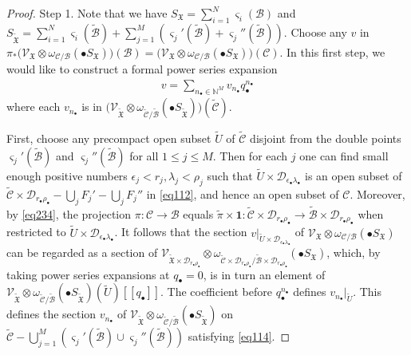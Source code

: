 \documentclass[12pt,a4paper,notitlepage]{report}
\theoremstyle{definition}
\theoremstyle{plain}
\newcommand{\fk}{\mathfrak}
\newcommand{\mc}{\mathcal}
\newcommand{\wtd}{\widetilde}
\newcommand{\id}{\mathbf{1}}
\newcommand{\scr}{\mathscr}
\newcommand{\sgm}{\varsigma}
\newcommand{\blt}{\bullet}
\newcommand{\Nbb}{\mathbb N}
\numberwithin{equation}{section}
\begin{document}
\begin{proof}
Step 1. Note that we have $S_{\fk X}=\sum_{i=1}^N\sgm_i(\mc B)$ and $S_{\wtd{\fk X}}=\sum_{i=1}^N\sgm_i(\wtd{\mc B})+\sum_{j=1}^M(\sgm_j'(\wtd{\mc B})+\sgm_j''(\wtd{\mc B}))$. Choose any $v$ in $\pi_*\big(\scr V_{\fk X}\otimes\omega_{\mc C/\mc B}(\blt S_{\fk X})\big)(\mc B)=\big(\scr V_{\fk X}\otimes\omega_{\mc C/\mc B}(\blt S_{\fk X})\big)(\mc C)$.  In this first step, we would like to construct a formal power series expansion
\begin{align}
v=\sum_{n_\blt\in\Nbb^M}v_{n_\blt}q_\blt^{n_\blt}\label{eq114}
\end{align}
where each $v_{n_\blt}$ is in $\big(\scr V_{\wtd{\fk X}}\otimes\omega_{\wtd{\mc C}/\wtd{\mc B}}(\blt S_{\wtd{\fk X}})\big)(\wtd{\mc C})$.  

First, choose any precompact open subset $\wtd U$ of $\wtd{\mc C}$ disjoint from the double points $\sgm_j'(\wtd{\mc B})$ and $\sgm_j''(\wtd{\mc B})$ for all $1\leq j\leq M$. Then for each $j$ one can find small enough positive numbers $\epsilon_j<r_j,\lambda_j<\rho_j$  such that $\wtd U\times\mc D_{\epsilon_\blt\lambda_\blt}$ is an open subset of  $\wtd {\mc C}\times\mc D_{r_\blt\rho_\blt}-\bigcup_j F_j'-\bigcup_j F_j''$ in \eqref{eq112}, and hence an open subset of $\mc C$.   Moreover, by \eqref{eq234}, the projection $\pi:\mc C\rightarrow\mc B$ equals $\wtd \pi\times \id:\wtd {\mc C}\times\mc D_{r_\blt\rho_\blt}\rightarrow \wtd{\mc B}\times \mc D_{r_\blt\rho_\blt}$ when restricted to  $\wtd U\times \mc D_{\epsilon_\blt\lambda_\blt}$. It follows that the section $v|_{\wtd U\times \mc D_{\epsilon_\blt\lambda_\blt}}$  of $\scr V_{\fk X}\otimes\omega_{\mc C/\mc B}(\blt S_{\fk X})$ can be regarded as a section of $\scr V_{\wtd{\fk X}\times\mc D_{r_\blt\rho_\blt}}\otimes\omega_{\wtd{\mc C}\times\mc D_{r_\blt\rho_\blt}/\wtd{\mc B}\times\mc D_{r_\blt\rho_\blt}}(\blt S_{\fk X})$, which, by taking power series expansions at $q_\blt=0$, is in turn an element of $\scr V_{\wtd{\fk X}}\otimes\omega_{\wtd{\mc C}/\wtd{\mc B}}(\blt S_{\wtd{\fk X}})(\wtd U)[[q_\blt]]$. The coefficient before $q_\blt^{n_\blt}$ defines $v_{n_\blt}|_{\wtd U}$. This defines the section $v_{n_\blt}$ of $\scr V_{\wtd{\fk X}}\otimes\omega_{\wtd{\mc C}/\wtd{\mc B}}(\blt S_{\wtd{\fk X}})$ on $\wtd{\mc C}-\bigcup_{j=1}^M(\sgm_j'(\wtd{\mc B})\cup \sgm_j''(\wtd{\mc B}))$ satisfying \eqref{eq114}.


\end{proof}
\end{document}
